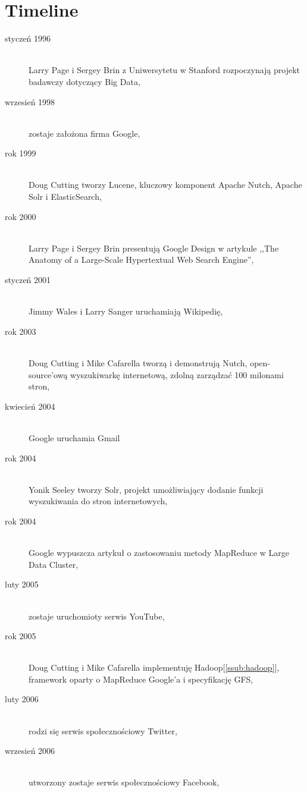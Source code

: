 \documentclass[10pt,twocolumn]{llncs}          %
\begin{document}
\section{Timeline}
\label{sub:timeline}
\begin{description}
    \item[styczeń 1996] \hfill \\ Larry Page i Sergey Brin z Uniwersytetu w Stanford rozpoczynają projekt badawczy dotyczący Big Data,
    \item[wrzesień 1998] \hfill \\ zostaje założona firma Google,
    \item[rok 1999] \hfill \\ Doug Cutting tworzy Lucene, kluczowy komponent Apache Nutch, Apache Solr i ElasticSearch,
    \item[rok 2000] \hfill \\ Larry Page i Sergey Brin presentują Google Design w artykule ,,The Anatomy of a Large-Scale Hypertextual Web Search Engine'',
    \item[styczeń 2001] \hfill \\ Jimmy Wales i Larry Sanger uruchamiają Wikipedię,
    \item[rok 2003] \hfill \\ Doug Cutting i Mike Cafarella tworzą i demonstrują Nutch, open-source'ową wyszukiwarkę internetową, zdolną zarządzać 100 milonami stron,
    \item[kwiecień 2004] \hfill \\ Google uruchamia Gmail
    \item[rok 2004] \hfill \\ Yonik Seeley tworzy Solr, projekt umożliwiający dodanie funkcji wyszukiwania do stron internetowych,
    \item[rok 2004] \hfill \\ Google wypuszcza artykuł o zastosowaniu metody MapReduce w Large Data Cluster,
    \item[luty 2005] \hfill \\ zostaje uruchomioty serwis YouTube,
    \item[rok 2005] \hfill \\ Doug Cutting i Mike Cafarella implementuję Hadoop[\ref{ssub:hadoop}], framework oparty o MapReduce Google'a i specyfikację GFS,
    \item[luty 2006] \hfill \\ rodzi się serwis społecznościowy Twitter,
    \item[wrzesień 2006] \hfill \\ utworzony zostaje serwis społecznościowy Facebook,

\end{description}
\end{document}

